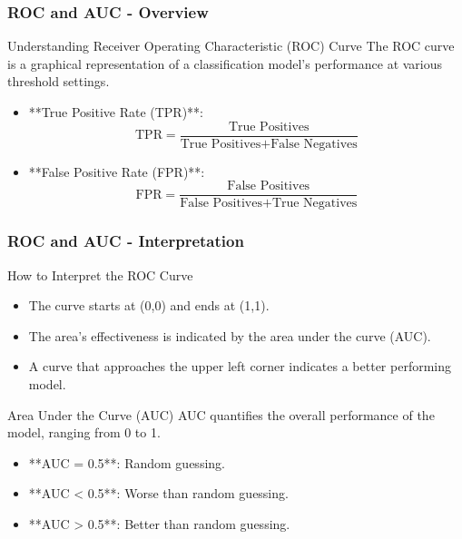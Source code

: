 \documentclass{beamer}
\begin{document}
\begin{frame}[fragile]
    \frametitle{ROC and AUC - Overview}
    \begin{block}{Understanding Receiver Operating Characteristic (ROC) Curve}
        The ROC curve is a graphical representation of a classification model's performance at various threshold settings.
    \end{block}
    \begin{itemize}
        \item **True Positive Rate (TPR)**:
            \begin{equation}
                \text{TPR} = \frac{\text{True Positives}}{\text{True Positives} + \text{False Negatives}}
            \end{equation}
        \item **False Positive Rate (FPR)**:
            \begin{equation}
                \text{FPR} = \frac{\text{False Positives}}{\text{False Positives} + \text{True Negatives}}
            \end{equation}
    \end{itemize}
\end{frame}

\begin{frame}[fragile]
    \frametitle{ROC and AUC - Interpretation}
    \begin{block}{How to Interpret the ROC Curve}
        \begin{itemize}
            \item The curve starts at (0,0) and ends at (1,1).
            \item The area's effectiveness is indicated by the area under the curve (AUC).
            \item A curve that approaches the upper left corner indicates a better performing model.
        \end{itemize}
    \end{block}
    
    \begin{block}{Area Under the Curve (AUC)}
        AUC quantifies the overall performance of the model, ranging from 0 to 1.
        \begin{itemize}
            \item **AUC = 0.5**: Random guessing.
            \item **AUC < 0.5**: Worse than random guessing.
            \item **AUC > 0.5**: Better than random guessing.
        \end{itemize}
    \end{block}
\end{frame}
\end{document}
